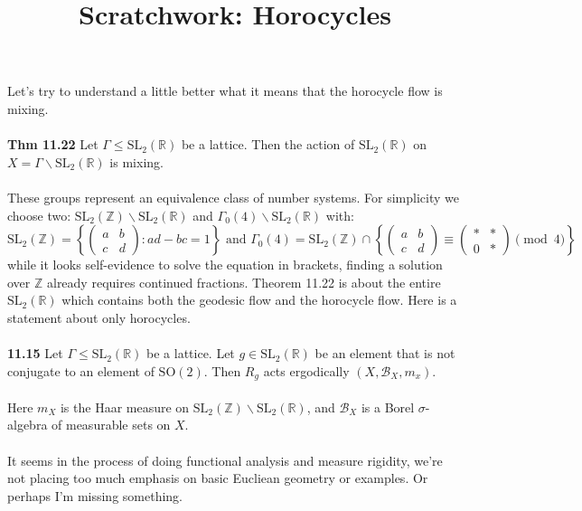 \documentclass[12pt]{article}
\title{Scratchwork: Horocycles}
\date{}
\begin{document}
\sffamily

\maketitle

\noindent Let's try to understand a little better what it means that the horocycle flow is mixing. \\ \\
\noindent \textbf{Thm 11.22} Let $\Gamma \leq \text{SL}_2(\mathbb{R})$ be a lattice.  Then the action of $\text{SL}_2(\mathbb{R})$ on $X = \Gamma \backslash \text{SL}_2(\mathbb{R})$ is mixing.  \\ \\
These groups represent an equivalence class of number systems.  For simplicity we choose two: $\text{SL}_2(\mathbb{Z})\backslash \text{SL}_2(\mathbb{R})$ and $\Gamma_0(4) \backslash \text{SL}_2(\mathbb{R})$ with:
$$ \text{SL}_2(\mathbb{Z}) = \left\{ \left( 
\begin{array}{cc} a & b \\ c & d \end{array}\right) : ad-bc = 1 \right\} \text{ and }\Gamma_0(4) = \text{SL}_2(\mathbb{Z}) \cap \left\{ 
\left( 
\begin{array}{cc} a & b \\ c & d \end{array}\right)  \equiv \left( 
\begin{array}{cc} * & * \\ 0 & * \end{array}\right) \pmod 4 \right\} $$
while it looks self-evidence to solve the equation in brackets, finding a solution over $\mathbb{Z}$ already requires continued fractions. Theorem 11.22 is about the entire $\text{SL}_2(\mathbb{R})$ which contains both the geodesic flow and the horocycle flow. Here is a statement about only horocycles.\\ \\
\textbf{11.15} Let $\Gamma \leq \text{SL}_2(\mathbb{R})$ be a lattice.  Let $g \in \text{SL}_2(\mathbb{R})$ be an element that is not conjugate to an element of $\text{SO}(2)$.  Then $R_g$ acts ergodically $(X, \mathcal{B}_X, m_x)$. \\ \\
Here $m_X$ is the Haar measure on $\text{SL}_2(\mathbb{Z})\backslash \text{SL}_2(\mathbb{R})$, and $\mathcal{B}_X$ is a Borel $\sigma$-algebra of measurable sets on $X$. \\ \\
It seems in the process of doing functional analysis and measure rigidity, we're not placing too much emphasis on basic Eucliean geometry or examples.  Or perhaps I'm missing something. \\ \\
\end{document}
